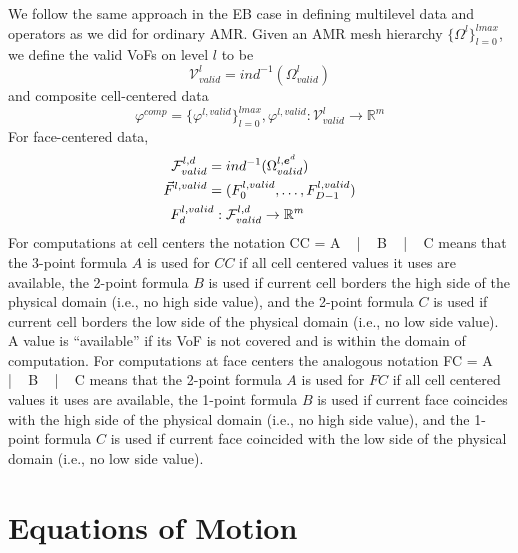 We follow the same approach in the EB case in defining multilevel data
and operators as we did for ordinary AMR. Given an AMR mesh hierarchy
$\{ \Omega^l \}^{lmax}_{l=0}$, we define the valid VoFs on level $l$ to be 
\begin{equation}
\mathcal{V}^l_{valid} = ind^{-1}(\Omega^l_{valid})
\end{equation}
and composite cell-centered data
\begin{equation}
\varphi^{comp} = \{ \varphi^{l, valid} \}^{lmax}_{l=0}, 
\varphi^{l,valid} : \mathcal{V}^l_{valid} \rightarrow \mathbb{R}^m
\end{equation}
For face-centered data,
\begin{equation}
\begin{split}
\mathcal{F}^{l, d}_{valid} = & \; ind^{-1}(\Omega^{l, {\boldsymbol{e}}^d}_{valid}) \\
\vec{F}^{l, valid} = & \; (F^{l, valid}_0, \ldots, F^{l, valid}_{D-1}) \\
F^{l, valid}_d : & \; \mathcal{F}^{l, d}_{valid} \rightarrow \mathbb{R}^m
\end{split}
\end{equation}
For computations at cell centers the notation
\beqa
CC = A ~ | ~ B ~ | ~ C
\eeqa
means that
the 3-point formula $A$ is used for $CC$ if all cell centered values it uses
are available,
the 2-point formula $B$ is used if current cell borders the high side
of the physical domain (i.e., no high side value), and
the 2-point formula $C$ is used if current cell borders the low side
of the physical domain (i.e., no low side value).  A value is
``available'' if its VoF is not covered and is within the domain 
of computation. For computations at face centers the analogous notation
\beqa
FC = A ~ | ~ B ~ | ~ C
\eeqa
means that
the 2-point formula $A$ is used for $FC$ if all cell centered values it uses
are available,
the 1-point formula $B$ is used if current face coincides with the high side
of the physical domain (i.e., no high side value), and
the 1-point formula $C$ is used if current face coincided with the low side
of the physical domain (i.e., no low side value).

\section{Equations of Motion}

